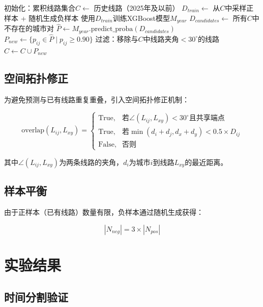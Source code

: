 \documentclass[12pt,a4paper]{article}
\begin{document}
\begin{algorithm}[h]
\caption{滚动预测算法}
初始化：累积线路集合$C \leftarrow$ 历史线路（2025年及以前）\;
 {
    $D_{train} \leftarrow$ 从$C$中采样正样本 + 随机生成负样本\;
    使用$D_{train}$训练XGBoost模型$M_{year}$\;
    $D_{candidates} \leftarrow$ 所有$C$中不存在的城市对\;
    $\hat{P} \leftarrow M_{year}.\text{predict\_proba}(D_{candidates})$\;
    $P_{new} \leftarrow \{p_{ij} \in \hat{P} \mid p_{ij} \geq 0.90\}$\;
    过滤：移除与$C$中线路夹角$<30^\circ$的线路\;
    $C \leftarrow C \cup P_{new}$\;
}
\end{algorithm}

\subsection{空间拓扑修正}

为避免预测与已有线路重复重叠，引入空间拓扑修正机制：

\begin{equation}
\text{overlap}(L_{ij}, L_{xy}) = \begin{cases}
\text{True}, & \text{若} \angle(L_{ij}, L_{xy}) < 30^\circ \text{且共享端点} \\
\text{True}, & \text{若} \min(d_i + d_j, d_x + d_y) < 0.5 \times D_{ij} \\
\text{False}, & \text{否则}
\end{cases}
\end{equation}

其中$\angle(L_{ij}, L_{xy})$为两条线路的夹角，$d_i$为城市$i$到线路$L_{xy}$的最近距离。

\subsection{样本平衡}

由于正样本（已有线路）数量有限，负样本通过随机生成获得：

\begin{equation}
|N_{neg}| = 3 \times |N_{pos}|
\end{equation}

\section{实验结果}

\subsection{时间分割验证}
\end{document}
